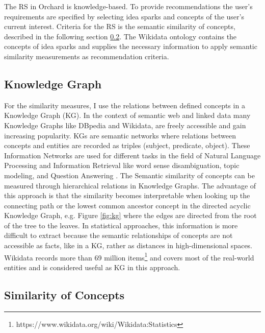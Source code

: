 \documentclass[pdftex,a4paper,12pt]{scrartcl}
\theoremstyle{definition}
\begin{document}

The RS in Orchard is knowledge-based. To provide recommendations the user's requirements are specified by selecting idea sparks and concepts of the user's current interest. Criteria for the RS is the semantic similarity of concepts, described in the following section \ref{similarity}. The Wikidata ontology contains the concepts of idea sparks and supplies the necessary information to apply semantic similarity measurements as recommendation criteria.
\subsection{Knowledge Graph}
    For the similarity measures, I use the relations between defined concepts in a Knowledge Graph (KG). In the context of semantic web and linked data many Knowledge Graphs like DBpedia and Wikidata, are freely accessible and gain increasing popularity. KGs are semantic networks where relations between concepts and entities are recorded as triples (subject, predicate, object). These Information Networks are used for different tasks in the field of Natural Language Processing and Information Retrieval like word sense disambiguation, topic modeling, and Question Answering \citep{nastase_topicdriven_2008}. 
    The Semantic similarity of concepts can be measured through hierarchical relations in Knowledge Graphs. The advantage of this approach is that the similarity becomes interpretable when looking up the connecting path or the lowest common ancestor concept in the directed acyclic Knowledge Graph, e.g. Figure \ref{fig:kg} where the edges are directed from the root of the tree to the leaves. In statistical approaches, this information is more difficult to extract because the semantic relationships of concepts are not accessible as facts, like in a KG, rather as distances in high-dimensional spaces.
    Wikidata records more than 69 million items\footnote{https://www.wikidata.org/wiki/Wikidata:Statistics} and covers most of the real-world entities and is considered useful as KG in this approach. 

\subsection{Similarity of Concepts}\label{similarity}
\end{document}
